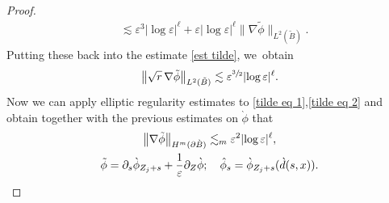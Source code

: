 \documentclass[10pt]{amsart}
\let\epsilon\varepsilon
\theoremstyle{definition}
\newcommand\bnorm[1]{\bigl\lVert #1\bigr\rVert}
\newcommand\eq{=}
\let\de\partial
\let\eps\epsilon
\begin{document}
\begin{proof}
\begin{align*}
&\lesssim \eps^3|{\log\eps}|^\ell+\eps|{\log\eps}|^\ell \bnorm{\nabla\tilde{\phi}}_{L^2(\tilde{B})}.
\end{align*}
Putting these back into the estimate \eqref{est tilde}, we~obtain
\begin{align*}
\bnorm{\sqrt{r}\,\nabla\tilde{\phi}}_{L^2(\tilde{B})}\lesssim \eps^{\sfrac{3}{2}}|{\log\eps}|^\ell.
\end{align*}
Now we can apply elliptic regularity estimates to \eqref{tilde eq 1},\eqref{tilde eq 2} and obtain together with the previous estimates on $\grave{\phi}$ that
\begin{gather*}
\bnorm{\nabla\tilde{\phi}}_{H^m(\de\grave{B})}\lesssim_m \eps^2|{\log\eps}|^\ell,\\
\tilde{\phi}\eq\de_s\grave{\phi}_{Z_j+s}+\frac{1}{\eps}\de_Z\grave{\phi}; \quad \hat{\phi}_s\eq\grave{\phi}_{Z_j+s}(\grave{d}(s,x)).\qedhere
\end{gather*}
\end{proof}

\label{subsec3.3}
\end{document}
